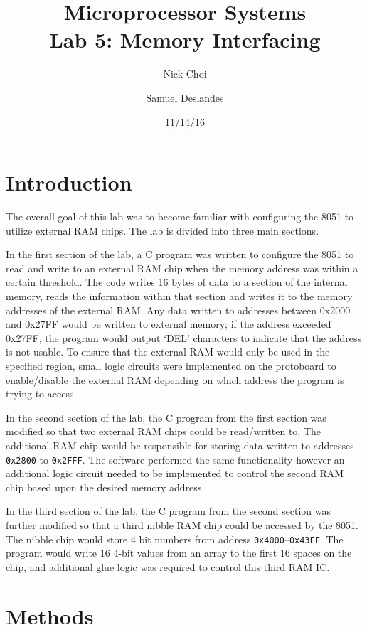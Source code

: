 \documentclass[12pt]{article}
\begin{document}
\title{Microprocessor Systems\\ Lab 5: Memory Interfacing }
\author{Nick Choi \and Samuel Deslandes}
\date{11/14/16}
\maketitle
\pagebreak
\section{Introduction}
The overall goal of this lab was to become familiar with configuring the 8051 to utilize external RAM chips. The lab is divided into three main sections. 

In the first section of the lab, a C program was written to configure the 8051 to read and write to an external RAM chip when the memory address was within a certain threshold. The code writes 16 bytes of data to a section of the internal memory, reads the information within that section and writes it to the memory addresses of the external RAM. Any data written to addresses between 0x2000 and 0x27FF would be written to external memory; if the address exceeded 0x27FF, the program would output `DEL' characters to indicate that the address is not usable. To ensure that the external RAM would only be used in the specified region, small logic circuits were implemented on the protoboard to enable/disable the external RAM depending on which address the program is trying to access. 

In the second section of the lab, the C program from the first section was modified so that two external RAM chips could be read/written to. The additional RAM chip would be responsible for storing data written to addresses \texttt{0x2800} to \texttt{0x2FFF}. The software performed the same functionality however an additional logic circuit needed to be implemented to control the second RAM chip based upon the desired memory address. 

In the third section of the lab, the C program from the second section was further modified so that a third nibble RAM chip could be accessed by the 8051. The nibble chip would store 4 bit numbers from address \texttt{0x4000}--\texttt{0x43FF}. The program would write 16 4-bit values from an array to the first 16 spaces on the chip, and additional glue logic was required to control this third RAM IC. 



\section{Methods}
\end{document}
